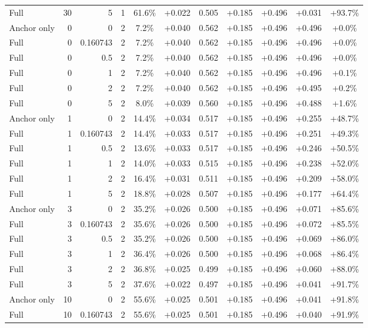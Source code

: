 \begin{table}[htbp]
\begin{tabular}{lrrrccccccc}
Full & 30 & 5 & 1 & 61.6\% & +0.022 & 0.505 & +0.185 & +0.496 & +0.031 & +93.7\% \\
Anchor only & 0 & 0 & 2 & 7.2\% & +0.040 & 0.562 & +0.185 & +0.496 & +0.496 & +0.0\% \\
Full & 0 & 0.160743 & 2 & 7.2\% & +0.040 & 0.562 & +0.185 & +0.496 & +0.496 & +0.0\% \\
Full & 0 & 0.5 & 2 & 7.2\% & +0.040 & 0.562 & +0.185 & +0.496 & +0.496 & +0.0\% \\
Full & 0 & 1 & 2 & 7.2\% & +0.040 & 0.562 & +0.185 & +0.496 & +0.496 & +0.1\% \\
Full & 0 & 2 & 2 & 7.2\% & +0.040 & 0.562 & +0.185 & +0.496 & +0.495 & +0.2\% \\
Full & 0 & 5 & 2 & 8.0\% & +0.039 & 0.560 & +0.185 & +0.496 & +0.488 & +1.6\% \\
Anchor only & 1 & 0 & 2 & 14.4\% & +0.034 & 0.517 & +0.185 & +0.496 & +0.255 & +48.7\% \\
Full & 1 & 0.160743 & 2 & 14.4\% & +0.033 & 0.517 & +0.185 & +0.496 & +0.251 & +49.3\% \\
Full & 1 & 0.5 & 2 & 13.6\% & +0.033 & 0.517 & +0.185 & +0.496 & +0.246 & +50.5\% \\
Full & 1 & 1 & 2 & 14.0\% & +0.033 & 0.515 & +0.185 & +0.496 & +0.238 & +52.0\% \\
Full & 1 & 2 & 2 & 16.4\% & +0.031 & 0.511 & +0.185 & +0.496 & +0.209 & +58.0\% \\
Full & 1 & 5 & 2 & 18.8\% & +0.028 & 0.507 & +0.185 & +0.496 & +0.177 & +64.4\% \\
Anchor only & 3 & 0 & 2 & 35.2\% & +0.026 & 0.500 & +0.185 & +0.496 & +0.071 & +85.6\% \\
Full & 3 & 0.160743 & 2 & 35.6\% & +0.026 & 0.500 & +0.185 & +0.496 & +0.072 & +85.5\% \\
Full & 3 & 0.5 & 2 & 35.2\% & +0.026 & 0.500 & +0.185 & +0.496 & +0.069 & +86.0\% \\
Full & 3 & 1 & 2 & 36.4\% & +0.026 & 0.500 & +0.185 & +0.496 & +0.068 & +86.4\% \\
Full & 3 & 2 & 2 & 36.8\% & +0.025 & 0.499 & +0.185 & +0.496 & +0.060 & +88.0\% \\
Full & 3 & 5 & 2 & 37.6\% & +0.022 & 0.497 & +0.185 & +0.496 & +0.041 & +91.7\% \\
Anchor only & 10 & 0 & 2 & 55.6\% & +0.025 & 0.501 & +0.185 & +0.496 & +0.041 & +91.8\% \\
Full & 10 & 0.160743 & 2 & 55.6\% & +0.025 & 0.501 & +0.185 & +0.496 & +0.040 & +91.9\% \\

\end{tabular}
\end{table}
